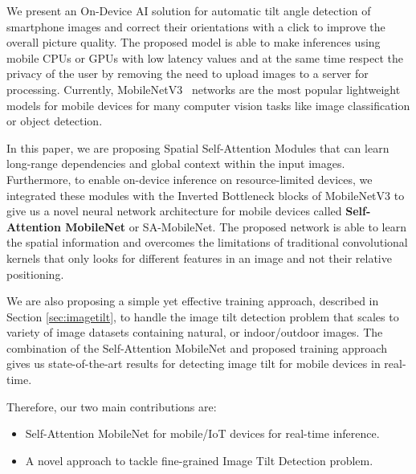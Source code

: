 \documentclass{bmvc2k}
\begin{document}
We present an On-Device AI solution for automatic tilt angle detection of smartphone images and correct their orientations with a click to improve the overall picture quality. The proposed model is able to make inferences using mobile CPUs or GPUs with low latency values and at the same time respect the privacy of the user by removing the need to upload images to a server for processing. Currently, MobileNetV3~\cite{mobilenetv3} networks are the most popular lightweight models for mobile devices for many computer vision tasks like image classification or object detection. 

In this paper, we are proposing Spatial Self-Attention Modules that can learn long-range dependencies and global context within the input images. Furthermore, to enable on-device inference on resource-limited devices, we integrated these modules with the Inverted Bottleneck blocks \cite{sandler2018mobilenetv2} of MobileNetV3 to give us a novel neural network architecture for mobile devices called \textbf{Self-Attention MobileNet} or SA-MobileNet. 
The proposed network is able to learn the spatial information and overcomes the limitations of traditional convolutional kernels that only looks for different features in an image and not their relative positioning.

We are also proposing a simple yet effective training approach, described in Section \ref{sec:imagetilt}, to handle the image tilt detection problem that scales to variety of image datasets containing natural, or indoor/outdoor images.
The combination of the Self-Attention MobileNet and proposed training approach gives us state-of-the-art results for detecting image tilt for mobile devices in real-time.

Therefore, our two main contributions are:
\begin{itemize}
    \item Self-Attention MobileNet for mobile/IoT devices for real-time inference.  
\vspace{-8pt}
    \item A novel approach to tackle fine-grained Image Tilt Detection problem.
\end{itemize} 
\vspace{-11pt}
\end{document}

